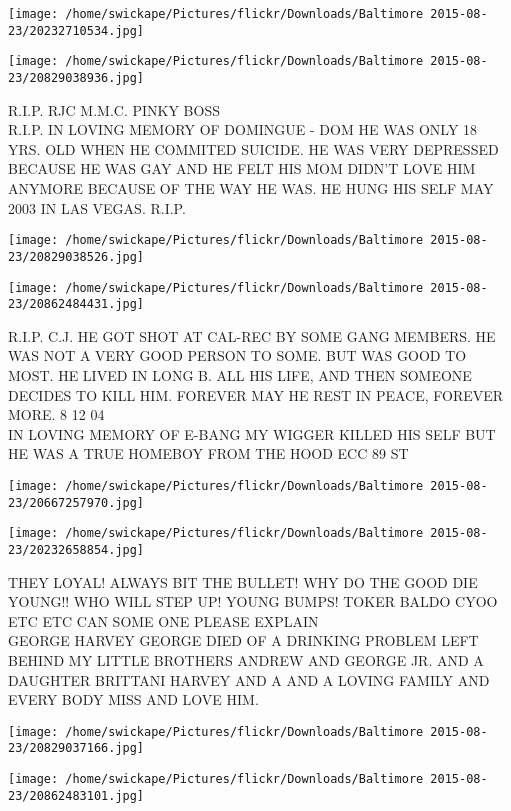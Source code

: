 \documentclass[10pt,letterpaper]{article}
\begin{document}
\texttt{[image: /home/swickape/Pictures/flickr/Downloads/Baltimore 2015-08-23/20232710534.jpg]}

\vspace{0.25in}
\texttt{[image: /home/swickape/Pictures/flickr/Downloads/Baltimore 2015-08-23/20829038936.jpg]}

R.I.P. RJC M.M.C. PINKY BOSS\\
R.I.P. IN LOVING MEMORY OF DOMINGUE {-} DOM HE WAS ONLY 18 YRS. OLD WHEN HE COMMITED SUICIDE.  HE WAS VERY DEPRESSED BECAUSE HE WAS GAY AND HE FELT HIS MOM DIDN'T LOVE HIM ANYMORE BECAUSE OF THE WAY HE WAS.  HE HUNG HIS SELF MAY 2003 IN LAS VEGAS.  R.I.P.
\pagebreak

\texttt{[image: /home/swickape/Pictures/flickr/Downloads/Baltimore 2015-08-23/20829038526.jpg]}

\vspace{0.25in}
\texttt{[image: /home/swickape/Pictures/flickr/Downloads/Baltimore 2015-08-23/20862484431.jpg]}

R.I.P. C.J. HE GOT SHOT AT CAL{-}REC BY SOME GANG MEMBERS.  HE WAS NOT A VERY GOOD PERSON TO SOME.  BUT WAS GOOD TO MOST.  HE LIVED IN LONG B. ALL HIS LIFE, AND THEN SOMEONE DECIDES TO KILL HIM.  FOREVER MAY HE REST IN PEACE, FOREVER MORE.  8 12 04\\
IN LOVING MEMORY OF E{-}BANG MY WIGGER KILLED HIS SELF BUT HE WAS A TRUE HOMEBOY FROM THE HOOD ECC 89 ST
\pagebreak

\texttt{[image: /home/swickape/Pictures/flickr/Downloads/Baltimore 2015-08-23/20667257970.jpg]}

\vspace{0.25in}
\texttt{[image: /home/swickape/Pictures/flickr/Downloads/Baltimore 2015-08-23/20232658854.jpg]}

THEY LOYAL!  ALWAYS BIT THE BULLET!  WHY DO THE GOOD DIE YOUNG!! WHO WILL STEP UP!  YOUNG BUMPS! TOKER BALDO CYOO ETC ETC CAN SOME ONE PLEASE EXPLAIN\\
GEORGE HARVEY GEORGE DIED OF A DRINKING PROBLEM LEFT BEHIND MY LITTLE BROTHERS ANDREW AND GEORGE JR. AND A DAUGHTER BRITTANI HARVEY AND A AND A LOVING FAMILY AND EVERY BODY MISS AND LOVE HIM.
\pagebreak

\texttt{[image: /home/swickape/Pictures/flickr/Downloads/Baltimore 2015-08-23/20829037166.jpg]}

\vspace{0.25in}
\texttt{[image: /home/swickape/Pictures/flickr/Downloads/Baltimore 2015-08-23/20862483101.jpg]}
\end{document}
